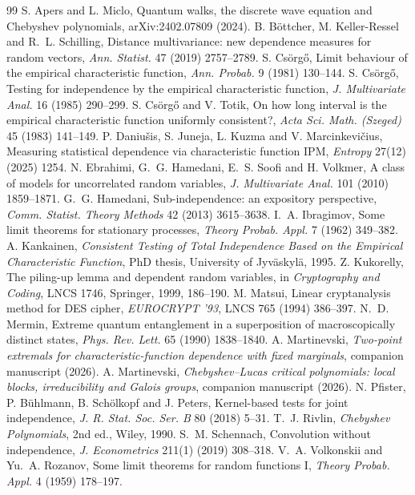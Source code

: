 \documentclass[11pt]{article}
\theoremstyle{definition}\newtheorem{definition}[theorem]{Definition}
\theoremstyle{remark}\newtheorem{remark}[theorem]{Remark}
\begin{document}
\begin{thebibliography}{99}\small
{} S. Apers and L. Miclo, Quantum walks, the discrete wave equation and Chebyshev polynomials, arXiv:2402.07809 (2024).
 B. B\"ottcher, M. Keller-Ressel and R.~L. Schilling, Distance multivariance: new dependence measures for random vectors, \emph{Ann. Statist.} 47 (2019) 2757--2789.
 S. Cs\"org\H{o}, Limit behaviour of the empirical characteristic function, \emph{Ann. Probab.} 9 (1981) 130--144.
 S. Cs\"org\H{o}, Testing for independence by the empirical characteristic function, \emph{J. Multivariate Anal.} 16 (1985) 290--299.
 S. Cs\"org\H{o} and V. Totik, On how long interval is the empirical characteristic function uniformly consistent?, \emph{Acta Sci. Math. (Szeged)} 45 (1983) 141--149.
 P. Daniu\v{s}is, S. Juneja, L. Kuzma and V. Marcinkevi\v{c}ius, Measuring statistical dependence via characteristic function IPM, \emph{Entropy} 27(12) (2025) 1254.
 N. Ebrahimi, G.~G. Hamedani, E.~S. Soofi and H. Volkmer, A class of models for uncorrelated random variables, \emph{J. Multivariate Anal.} 101 (2010) 1859--1871.
 G.~G. Hamedani, Sub-independence: an expository perspective, \emph{Comm. Statist. Theory Methods} 42 (2013) 3615--3638.
 I.~A. Ibragimov, Some limit theorems for stationary processes, \emph{Theory Probab. Appl.} 7 (1962) 349--382.
 A. Kankainen, \emph{Consistent Testing of Total Independence Based on the Empirical Characteristic Function}, PhD thesis, University of Jyv\"askyl\"a, 1995.
 Z. Kukorelly, The piling-up lemma and dependent random variables, in \emph{Cryptography and Coding}, LNCS 1746, Springer, 1999, 186--190.
 M. Matsui, Linear cryptanalysis method for DES cipher, \emph{EUROCRYPT '93}, LNCS 765 (1994) 386--397.
 N.~D. Mermin, Extreme quantum entanglement in a superposition of macroscopically distinct states, \emph{Phys. Rev. Lett.} 65 (1990) 1838--1840.
 A. Martinevski, \emph{Two-point extremals for characteristic-function dependence with fixed marginals}, companion manuscript (2026).
 A. Martinevski, \emph{Chebyshev--Lucas critical polynomials: local blocks, irreducibility and Galois groups}, companion manuscript (2026).
 N. Pfister, P. B\"uhlmann, B. Sch\"olkopf and J. Peters, Kernel-based tests for joint independence, \emph{J. R. Stat. Soc. Ser. B} 80 (2018) 5--31.
 T.~J. Rivlin, \emph{Chebyshev Polynomials}, 2nd ed., Wiley, 1990.
 S.~M. Schennach, Convolution without independence, \emph{J. Econometrics} 211(1) (2019) 308--318.
 V.~A. Volkonskii and Yu.~A. Rozanov, Some limit theorems for random functions I, \emph{Theory Probab. Appl.} 4 (1959) 178--197.
\end{thebibliography}
\end{document}
